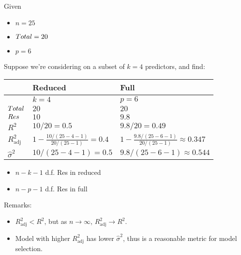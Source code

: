 \begin{Example}{}{}
      Given
      \begin{itemize}
            \item $ n=25 $
            \item $ \relax{Total}=20 $
            \item $ p=6 $
      \end{itemize}
      Suppose
      we're considering on a subset of $ k=4 $
      predictors, and find:

      \begin{center}
            \begin{tabularx}{0.8\linewidth}{@{}YYY@{}}
                                       & Reduced                                 & Full                                              \\
                  \midrule
                                       & $ k=4 $                                 & $ p=6 $                                           \\
                  $ \relax{Total} $       & $ 20 $                                  & $ 20 $                                            \\
                  $ \relax{Res} $         & $ 10 $                                  & $ 9.8 $                                           \\
                  \midrule
                  $ R^2 $              & $ 10/20=0.5 $                           & $ 9.8/20=0.49 $                                   \\
                  $ R^2_{\text{adj}} $ & $ 1-\frac{10/(25-4-1)}{20/(25-1)}=0.4 $ & $ 1-\frac{9.8/(25-6-1)}{20/(25-1)}\approx 0.347 $ \\
                  $ \hat{\sigma}^2 $   & $ 10/(25-4-1)=0.5 $                     & $ 9.8/(25-6-1)\approx 0.544 $
            \end{tabularx}
      \end{center}
      \begin{itemize}
            \item $ n-k-1 $ d.f. Res in reduced
            \item $ n-p-1 $ d.f. Res in full
      \end{itemize}
      Remarks:
      \begin{itemize}
            \item $ R^2_{\text{adj}}<R^2 $, but as $ n\to\infty $,
                  $ R^2_{\text{adj}}\to R^2 $.
            \item Model with higher $ R^2_{\text{adj}} $
                  has lower $ \hat{\sigma}^2 $,
                  thus is a reasonable metric for model selection.
      \end{itemize}
\end{Example}

